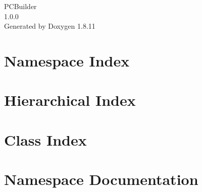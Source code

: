 \documentclass[twoside]{book}
\newcommand{\+}{\discretionary{\mbox{\scriptsize$\hookleftarrow$}}{}{}}
\newcommand{\clearemptydoublepage}{%
  \newpage{\pagestyle{empty}\cleardoublepage}%
}
\begin{document}
\hypersetup{pageanchor=false,
             bookmarksnumbered=true,
             pdfencoding=unicode
            }
\begin{titlepage}
\vspace*{7cm}
\begin{center}%
{\Large P\+C\+Builder \\[1ex]\large 1.\+0.\+0 }\\
\vspace*{1cm}
{\large Generated by Doxygen 1.8.11}\\
\end{center}
\end{titlepage}
\clearemptydoublepage
\tableofcontents
\clearemptydoublepage
{}
\hypersetup{pageanchor=true}

\chapter{Namespace Index}

\chapter{Hierarchical Index}

\chapter{Class Index}

\chapter{Namespace Documentation}









\end{document}
